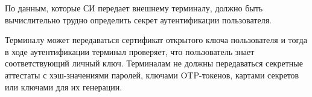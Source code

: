 \label{R.AP.Term2}
По данным, которые СИ передает внешнему терминалу, должно быть вычислительно 
трудно определить секрет аутентификации пользователя.
 
\begin{note*}
Терминалу может передаваться сертификат открытого ключа пользователя 
и тогда в ходе аутентификации терминал проверяет, что пользователь 
знает соответствующий личный ключ. Терминалам не должны передаваться 
секретные аттестаты с хэш-значениями паролей, ключами OTP-токенов, картами 
секретов или ключами для их генерации.
\end{note*}


%
%
